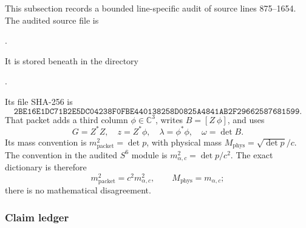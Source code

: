 This subsection records a bounded line-specific audit of source lines
875--1654.  The audited source file is
\begin{center}
\small{}.
\end{center}
It is stored beneath
 in the directory
\begin{center}
\small{}.
\end{center}
Its file SHA-256 is
\[
\texttt{2BE16E1DC71B2E5DC04238F0FBE440138258D0825A4841AB2F29662587681599}.
\]
That packet adds a third column \(\phi\in\mathbb C^3\), writes
\(B=[Z\ \phi]\), and uses
\[
 G=Z^*Z,\quad z=Z^*\phi,\quad
 \lambda=\phi^*\phi,\quad \omega=\det B.
\]
Its mass convention is \(m^2_{\mathrm{packet}}=\det p\), with physical
mass \(M_{\mathrm{phys}}=\sqrt{\det p}/c\).  The convention in the
audited \(S^6\) module is
\(m_{\alpha,c}^2=\det p/c^2\).  The exact dictionary is therefore
\[
 m^2_{\mathrm{packet}}=c^2m_{\alpha,c}^2,\qquad
 M_{\mathrm{phys}}=m_{\alpha,c};
\]
there is no mathematical disagreement.

\subsubsection{Claim ledger}

